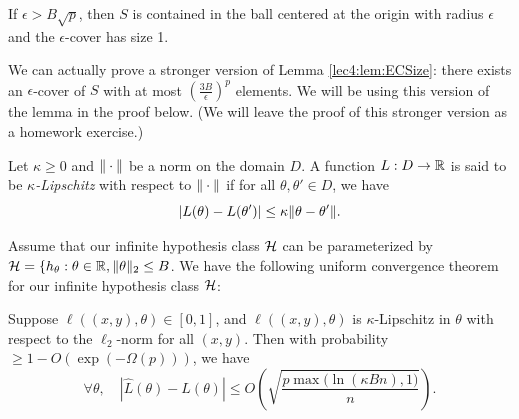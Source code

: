 \begin{remark}
If $\epsilon > B\sqrt{p}$, then $S$ is contained in the ball centered at the origin with radius $\epsilon$ and the $\epsilon$-cover has size 1.
\end{remark}

\begin{remark}\label{lec4:rem:enet}
We can actually prove a stronger version of Lemma \ref{lec4:lem:ECSize}: there exists an $\epsilon$-cover of $S$ with at most $\left(\frac{3B}{\epsilon}\right)^p$ elements. We will be using this version of the lemma in the proof below. (We will leave the proof of this stronger version as a homework exercise.)
\end{remark}


\begin{definition}
Let $\kappa \ge 0$ and $\|\cdot\|$ be a norm on the domain $D$. A function $L:D \to \mathbb R$ is said to be \emph{$\kappa$-Lipschitz} with respect to $\|\cdot\|$ if for all $\theta, \theta' \in D$, we have
$$
    |L(\theta)-L(\theta')| \le \kappa \|\theta-\theta'\|.
$$
\end{definition}

Assume that our infinite hypothesis class $\mathcal H$ can be parameterized by $\mathcal H = \{h_{\theta} : \theta \in \mathbb{R}, \Vert \theta \Vert_2 \leq B$. We have the following uniform convergence theorem for our infinite hypothesis class $\mathcal H$:

\begin{theorem}\label{lec4:thm:main}
Suppose $\ell((x,y), \theta) \in [0,1]$, and $\ell((x,y), \theta)$ is $\kappa$-Lipschitz in $\theta$ with respect to the $\ell_2$-norm for all $(x, y)$. Then with probability $\ge 1-O(\exp(-\Omega(p)))$, we have
\begin{equation}
    \forall \theta, \quad |\hat L(\theta)- L(\theta)| \leq  O\left(\sqrt{\frac{p \max(\ln{(\kappa Bn), 1)}}{n}}\right).
\end{equation}
\end{theorem}

